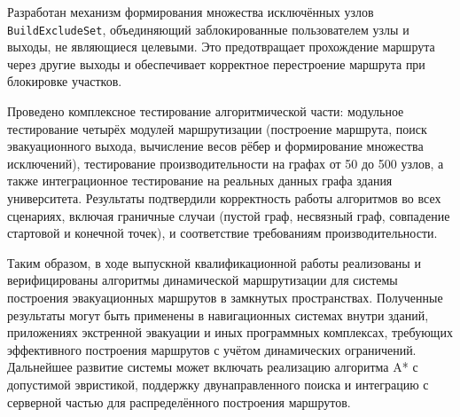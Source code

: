 Разработан механизм формирования множества исключённых узлов \texttt{BuildExcludeSet}, объединяющий заблокированные пользователем узлы и выходы, не являющиеся целевыми. Это предотвращает прохождение маршрута через другие выходы и обеспечивает корректное перестроение маршрута при блокировке участков.

Проведено комплексное тестирование алгоритмической части: модульное тестирование четырёх модулей маршрутизации (построение маршрута, поиск эвакуационного выхода, вычисление весов рёбер и формирование множества исключений), тестирование производительности на графах от 50 до 500 узлов, а также интеграционное тестирование на реальных данных графа здания университета. Результаты подтвердили корректность работы алгоритмов во всех сценариях, включая граничные случаи (пустой граф, несвязный граф, совпадение стартовой и конечной точек), и соответствие требованиям производительности.

Таким образом, в ходе выпускной квалификационной работы реализованы и верифицированы алгоритмы динамической маршрутизации для системы построения эвакуационных маршрутов в замкнутых пространствах. Полученные результаты могут быть применены в навигационных системах внутри зданий, приложениях экстренной эвакуации и иных программных комплексах, требующих эффективного построения маршрутов с учётом динамических ограничений. Дальнейшее развитие системы может включать реализацию алгоритма A* с допустимой эвристикой, поддержку двунаправленного поиска и интеграцию с серверной частью для распределённого построения маршрутов.
